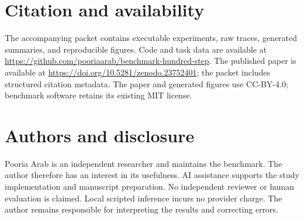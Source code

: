 \documentclass{article}
\begin{document}
\section{Citation and availability}
The accompanying packet contains executable experiments, raw traces, generated summaries, and reproducible figures. Code and task data are available at \url{https://github.com/pooriaarab/benchmark-hundred-step}. The published paper is available at \url{https://doi.org/10.5281/zenodo.23752401}; the packet includes structured citation metadata. The paper and generated figures use CC-BY-4.0; benchmark software retains its existing MIT license.\par
\section{Authors and disclosure}
Pooria Arab is an independent researcher and maintains the benchmark. The author therefore has an interest in its usefulness. AI assistance supports the study implementation and manuscript preparation. No independent reviewer or human evaluation is claimed. Local scripted inference incurs no provider charge. The author remains responsible for interpreting the results and correcting errors.\par

\end{document}
